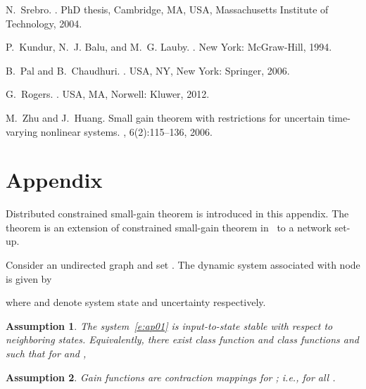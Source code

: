 \documentclass[journal]{IEEEtran}
\newtheorem{assumption}{\bf Assumption}[section]
\begin{document}
\begin{thebibliography}{10}
N.~Srebro.
.
\newblock PhD thesis, Cambridge, MA, USA,  Massachusetts Institute of Technology, 2004.

P.~Kundur, N.~J. Balu, and M.~G. Lauby.
.
\newblock New York: McGraw-Hill, 1994.

B.~Pal and B.~Chaudhuri.
.
\newblock USA, NY, New York: Springer, 2006.

G.~Rogers.
.
\newblock USA, MA, Norwell: Kluwer, 2012.

M.~Zhu and J.~Huang.
\newblock Small gain theorem with restrictions for uncertain time-varying
  nonlinear systems.
, 6(2):115--136, 2006.

\end{thebibliography}


\appendix



\section{Appendix}




Distributed constrained small-gain theorem is introduced in this appendix.
The theorem is an extension of constrained small-gain theorem in~\cite{MZ-JH:CIS06} to a network set-up.


Consider an undirected graph  and set .
The dynamic system associated with node  is given by

where  and  denote system state and uncertainty respectively.
\begin{assumption}
The system~\eqref{e:ap01} is input-to-state stable with respect to neighboring states. Equivalently, there exist class  function  and class  functions  and  such that for  and ,
\label{ap-asm1}

\end{assumption}

\begin{assumption}
Gain functions  are contraction mappings for ; i.e.,  for all .
\label{ap-asm2}
\end{assumption}
\end{document}
